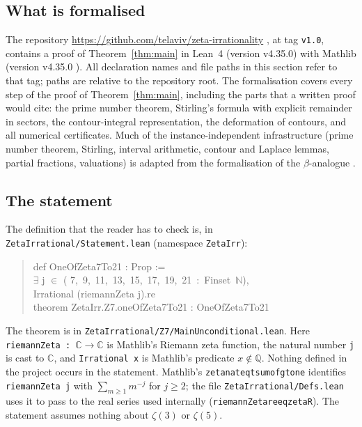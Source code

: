 \documentclass[11pt]{amsart}
\theoremstyle{definition}
\theoremstyle{remark}
\numberwithin{equation}{section}
\newcommand{\QQ}{\mathbb{Q}}
\newcommand{\CC}{\mathbb{C}}
\newcommand{\lean}[1]{{\def\_{\textunderscore\allowbreak}\texttt{#1}}}
\begin{document}
\subsection{What is formalised}
The repository \url{https://github.com/telaviv/zeta-irrationality} \cite{ZetaRepo}, at tag \lean{v1.0},
contains a proof of
Theorem~\ref{thm:main} in Lean~4 \cite{LeanFour} (version v4.35.0) with Mathlib \cite{Mathlib} (version v4.35.0
\cite{Mathlib4}). All declaration names and file paths in this section refer to that tag; paths are relative
to the repository root. The formalisation covers every step of the proof of
Theorem~\ref{thm:main}, including the parts that a written proof would cite: the prime number theorem, Stirling's
formula with explicit remainder in sectors, the contour-integral representation, the deformation of contours, and all
numerical certificates. Much of the instance-independent infrastructure (prime number theorem, Stirling, interval
arithmetic, contour and Laplace lemmas, partial fractions, valuations) is adapted from the formalisation of the
$\beta$-analogue \cite{BetaPaper}.

\subsection{The statement}
The definition that the reader has to check is, in \lean{ZetaIrrational\slash{}Statement.lean} (namespace
\lean{ZetaIrr}):
\begin{quote}\ttfamily\footnotesize
def OneOfZeta7To21 : Prop :=\\
\hspace*{2em}$\exists$ j $\in$ ( 7,~9,~11,~13,~15,~17,~19,~21~:~Finset~$\mathbb{N}$),\\
\hspace*{4em}Irrational (riemannZeta j).re\\[2pt]
theorem ZetaIrr.Z7.oneOfZeta7To21 : OneOfZeta7To21
\end{quote}
The theorem is in \lean{ZetaIrrational\slash{}Z7\slash{}MainUnconditional.lean}. Here \lean{riemannZeta : $\mathbb C\to\mathbb C$} is
Mathlib's Riemann zeta function, the natural number \lean{j} is cast to $\CC$, and \lean{Irrational x} is Mathlib's
predicate $x\notin\QQ$. Nothing defined in the project occurs in the statement. Mathlib's
\lean{zeta\_nat\_eq\_tsum\_of\_gt\_one} identifies \lean{riemannZeta j} with $\sum_{m\ge1}m^{-j}$ for $j\ge2$; the
file \lean{ZetaIrrational\slash{}Defs.lean} uses it to pass to the real series used internally
(\lean{riemannZeta\_re\_eq\_zetaR}). The statement assumes nothing about $\zeta(3)$ or $\zeta(5)$.
\end{document}
